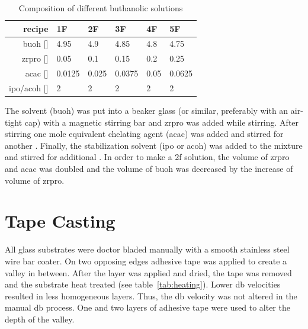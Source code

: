 \begin{table}[h]
	\centering
	\caption{Composition of different buthanolic solutions}
	\label{tab:rec2}
	\begin{tabular}{rlllll}
		\hline
		recipe	&1F		&2F		&3F		&4F		&5F		\\
		\hline
		\gls{buoh} [\ml{}]		&4.95	&4.9	&4.85	&4.8	&4.75	\\
		\gls{zrpro} [\ml{}]	&0.05	&0.1	&0.15	&0.2	&0.25	\\
		\gls{acac} [\ml{}]		&0.0125	&0.025	&0.0375	&0.05	&0.0625	\\
		\gls{ipo}/\gls{acoh} [\ml{}]		&2		&2		&2		&2		&2		\\
		\hline
	\end{tabular}
\end{table}

The solvent (\gls{buoh}) was put into a beaker glass (or similar, preferably with an 
air-tight cap) with a magnetic stirring bar and \gls{zrpro} was added while stirring. After 
stirring  one mole equivalent chelating agent (\gls{acac}) was 
added and stirred for another . Finally, the stabilization 
solvent\cite{Hu2016} (\gls{ipo} or \gls{acoh}) was added to the mixture and stirred for 
additional . 
In order to make a \gls{2f} solution, the volume of \gls{zrpro} and \gls{acac} was 
doubled and the volume of \gls{buoh} was decreased by the increase of volume of \gls{zrpro}. 

\section{Tape Casting}
\label{sec:exp-db}
All glass substrates were doctor bladed manually with a smooth stainless steel wire bar coater. 
On two opposing edges adhesive tape was applied to create a valley in between. 
After the layer was applied and dried, the tape was removed and the substrate heat treated (see table~\ref{tab:heating}).
Lower \gls{db} velocities resulted in less homogeneous layers.
Thus, the \gls{db} velocity was not altered in the manual \gls{db} process. 
One and two layers of adhesive tape were used to alter the depth of the valley. 

